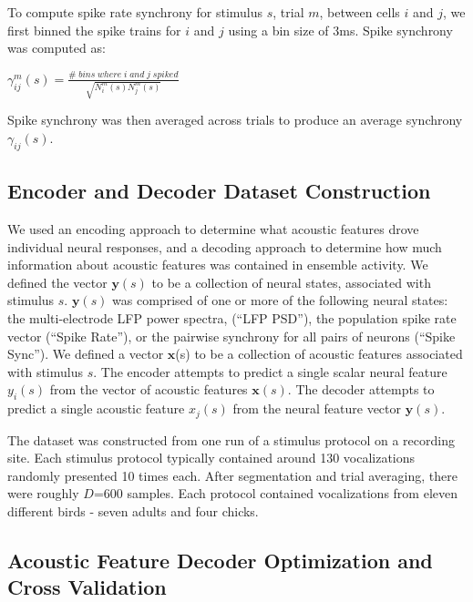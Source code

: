     To compute spike rate synchrony for stimulus $s$, trial $m$, between cells $i$ and $j$, we first binned the spike trains for $i$ and $j$ using a bin size of 3ms. Spike synchrony was computed as:

\begin{center}
$\gamma _{ij} ^m (s)=\frac{\# \; bins\; where\; i\; and \; j\; spiked}{\sqrt{N_i^m(s) N_j^m (s)}}$ 
\end{center}

Spike synchrony was then averaged across trials to produce an average synchrony $\gamma _{ij}(s)$.


\subsection{Encoder and Decoder Dataset Construction}

    We used an encoding approach to determine what acoustic features drove individual neural responses, and a decoding approach to determine how much information about acoustic features was contained in ensemble activity. We defined the vector $\textbf{y}(s)$ to be a collection of neural states, associated with stimulus $s$. $\textbf{y}(s)$ was comprised of one or more of the following neural states: the multi-electrode LFP power spectra, (``LFP PSD''), the population spike rate vector (``Spike Rate''), or the pairwise synchrony for all pairs of neurons (``Spike Sync''). We defined a vector $\textbf{x}$(s) to be a collection of acoustic features associated with stimulus $s$. The encoder attempts to predict a single scalar neural feature $y_i(s)$ from the vector of acoustic features $\textbf{x}(s)$. The decoder attempts to predict a single acoustic feature $x_j (s)$ from the neural feature vector $\textbf{y}(s)$.

The dataset was constructed from one run of a stimulus protocol on a recording site. Each stimulus protocol typically contained around 130 vocalizations randomly presented 10 times each. After segmentation and trial averaging, there were roughly $D$=600 samples. Each protocol contained vocalizations from eleven different birds - seven adults and four chicks. 


\subsection{Acoustic Feature Decoder Optimization and Cross Validation}

